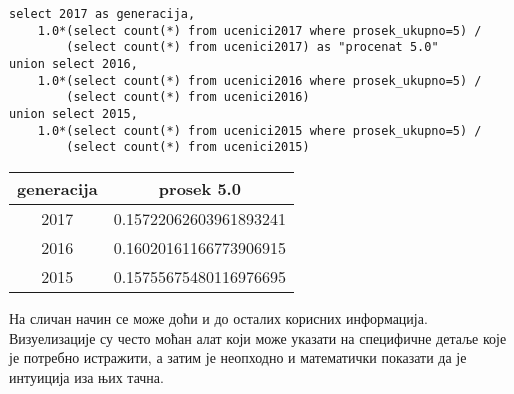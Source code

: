 \begin{verbatim}
select 2017 as generacija, 
    1.0*(select count(*) from ucenici2017 where prosek_ukupno=5) /
        (select count(*) from ucenici2017) as "procenat 5.0" 
union select 2016, 
    1.0*(select count(*) from ucenici2016 where prosek_ukupno=5) /
        (select count(*) from ucenici2016) 
union select 2015, 
    1.0*(select count(*) from ucenici2015 where prosek_ukupno=5) /
        (select count(*) from ucenici2015)
\end{verbatim}

\begin{tabular}{c|c}
generacija & prosek 5.0 \\ \hline
2017 & 0.15722062603961893241 \\
2016 & 0.16020161166773906915 \\
2015 & 0.15755675480116976695 \\
\end{tabular}

На сличан начин се може доћи и до осталих корисних информација. Визуелизације су често моћан алат који може указати на специфичне детаље које је потребно истражити, а затим је неопходно и математички показати да је интуиција иза њих тачна.